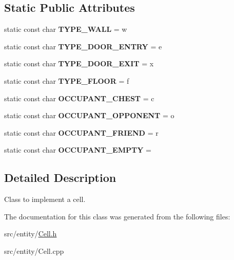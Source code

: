 \subsection*{Static Public Attributes}
\begin{DoxyCompactItemize}
\item 
\hypertarget{classCell_aee89844377bf3c068f536d720059eb38}{}\label{classCell_aee89844377bf3c068f536d720059eb38} 
static const char {\bfseries T\+Y\+P\+E\+\_\+\+W\+A\+LL} = \textquotesingle{}w\textquotesingle{}
\item 
\hypertarget{classCell_a2817727832c0444ac1d133e26079bfac}{}\label{classCell_a2817727832c0444ac1d133e26079bfac} 
static const char {\bfseries T\+Y\+P\+E\+\_\+\+D\+O\+O\+R\+\_\+\+E\+N\+T\+RY} = \textquotesingle{}e\textquotesingle{}
\item 
\hypertarget{classCell_aecc7dd32172a9dcc250e425a56ecda3a}{}\label{classCell_aecc7dd32172a9dcc250e425a56ecda3a} 
static const char {\bfseries T\+Y\+P\+E\+\_\+\+D\+O\+O\+R\+\_\+\+E\+X\+IT} = \textquotesingle{}x\textquotesingle{}
\item 
\hypertarget{classCell_a61091404d91e4e167735507fd7a573dd}{}\label{classCell_a61091404d91e4e167735507fd7a573dd} 
static const char {\bfseries T\+Y\+P\+E\+\_\+\+F\+L\+O\+OR} = \textquotesingle{}f\textquotesingle{}
\item 
\hypertarget{classCell_a25529c63c082cbb3ca0bbc4248f764d5}{}\label{classCell_a25529c63c082cbb3ca0bbc4248f764d5} 
static const char {\bfseries O\+C\+C\+U\+P\+A\+N\+T\+\_\+\+C\+H\+E\+ST} = \textquotesingle{}c\textquotesingle{}
\item 
\hypertarget{classCell_a5d22265147c09d2e78464a7b709956dc}{}\label{classCell_a5d22265147c09d2e78464a7b709956dc} 
static const char {\bfseries O\+C\+C\+U\+P\+A\+N\+T\+\_\+\+O\+P\+P\+O\+N\+E\+NT} = \textquotesingle{}o\textquotesingle{}
\item 
\hypertarget{classCell_aea4173fcd295e2c4bfba5ed16e1e9a2c}{}\label{classCell_aea4173fcd295e2c4bfba5ed16e1e9a2c} 
static const char {\bfseries O\+C\+C\+U\+P\+A\+N\+T\+\_\+\+F\+R\+I\+E\+ND} = \textquotesingle{}r\textquotesingle{}
\item 
\hypertarget{classCell_accb7c7acaa1273831c44fb58c4846ca3}{}\label{classCell_accb7c7acaa1273831c44fb58c4846ca3} 
static const char {\bfseries O\+C\+C\+U\+P\+A\+N\+T\+\_\+\+E\+M\+P\+TY} = \textquotesingle{} \textquotesingle{}
\end{DoxyCompactItemize}


\subsection{Detailed Description}
Class to implement a cell. 

The documentation for this class was generated from the following files\+:\begin{DoxyCompactItemize}
\item 
src/entity/\hyperlink{Cell_8h}{Cell.\+h}\item 
src/entity/Cell.\+cpp\end{DoxyCompactItemize}
